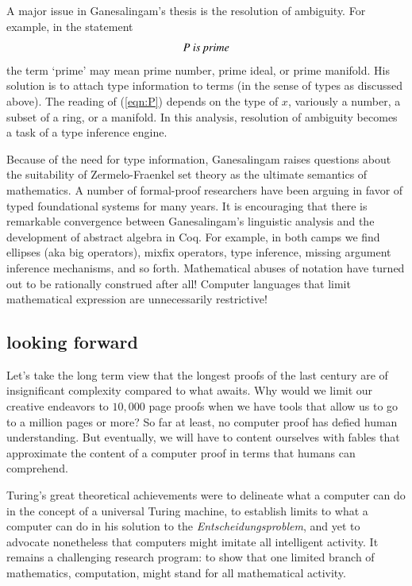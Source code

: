 \documentclass{llncs}
\begin{document}
A major issue in Ganesalingam's thesis is the resolution of ambiguity.
For example, in the statement
\begin{equation}\label{eqn:P}
P \text{\it ~is prime}
\end{equation}
the term `prime' may mean prime number, prime ideal, or prime
manifold.  His solution is to attach type information to terms (in the
sense of types as discussed above).  The reading of (\ref{eqn:P})
depends on the type of $x$, variously a number, a subset of a ring, or
a manifold.  In this analysis, resolution of ambiguity becomes a task
of a type inference engine.

Because of the need for type information, Ganesalingam raises
questions about the suitability of Zermelo-Fraenkel set theory as the
ultimate semantics of mathematics.  A number of formal-proof
researchers have been arguing in favor of typed foundational systems
for many years.  It is encouraging that there is remarkable
convergence between Ganesalingam's linguistic analysis and the
development of abstract algebra in Coq. For example, in both camps we
find ellipses (aka big operators), mixfix operators, type inference,
missing argument inference mechanisms, and so forth.  Mathematical
abuses of notation have turned out to be rationally construed after
all!  Computer languages that limit mathematical expression are
unnecessarily restrictive!



\subsection{looking forward}

Let's take the long term view that the longest proofs of the last
century are of insignificant complexity compared to what awaits.  Why
would we limit our creative endeavors to $10,000$ page proofs when we
have tools that allow us to go to a million pages or more?  So far at
least, no computer proof has defied human understanding.  But
eventually, we will have to content ourselves with fables that
approximate the content of a computer proof in terms that humans can
comprehend.


Turing's great theoretical achievements were to delineate what a
computer can do in the concept of a universal Turing machine, to
establish limits to what a computer can do in his solution to the {\it
  Entscheidungsproblem}, and yet to advocate nonetheless that
computers might imitate all intelligent activity. It remains a
challenging research program: to show that one limited branch of
mathematics, computation, might stand for all mathematical activity.
\end{document}
